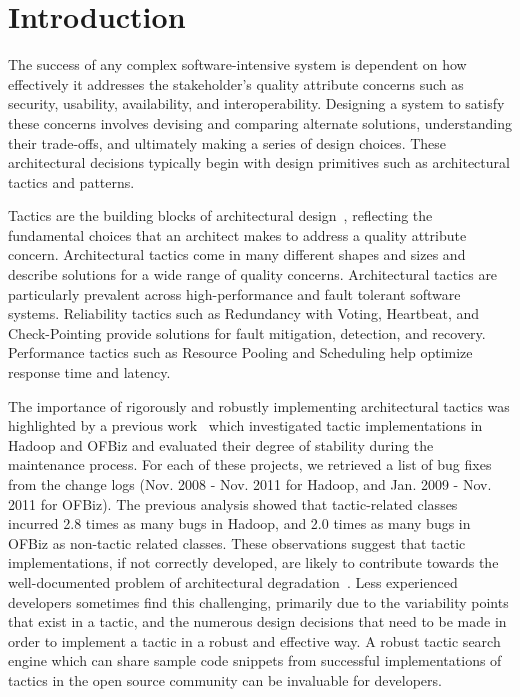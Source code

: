 \section{Introduction}
The success of any complex software-intensive system is dependent on how effectively it addresses the stakeholder's quality attribute concerns such as security, usability, availability, and interoperability. Designing a system to satisfy these concerns involves devising and comparing alternate solutions, understanding their trade-offs, and ultimately making a series of design choices. These architectural decisions typically begin with design primitives such as architectural tactics and patterns.

Tactics are the building blocks of architectural design~\cite{bass:arch12}, reflecting the fundamental choices that an architect makes to address a quality attribute concern. Architectural tactics come in many different shapes and sizes and describe solutions for a wide range of quality concerns. Architectural tactics are particularly prevalent across high-performance and fault tolerant software systems. Reliability tactics such as Redundancy with Voting, Heartbeat, and Check-Pointing provide solutions for fault mitigation, detection, and recovery. Performance tactics such as Resource Pooling and Scheduling help optimize response time and latency.







The importance of rigorously and robustly implementing architectural tactics was highlighted by a previous work~\cite{MSRBuble} which investigated tactic implementations in Hadoop and OFBiz and evaluated their degree of stability during the maintenance process. For each of these projects, we retrieved a list of bug fixes from the change logs (Nov. 2008 - Nov. 2011 for Hadoop, and Jan. 2009 - Nov. 2011 for OFBiz). The previous analysis showed that tactic-related classes incurred 2.8 times as many bugs in Hadoop, and 2.0 times as many bugs in OFBiz as non-tactic related classes. These observations suggest that tactic implementations, if not correctly developed, are likely to contribute towards the well-documented problem of architectural degradation~\cite{Erosion}. Less experienced developers sometimes find this challenging, primarily due to the variability points that exist in a tactic, and the numerous design decisions that need to be made in order to implement a tactic in a robust and effective way. A robust tactic search engine which can share sample code snippets from successful implementations of tactics in the open source community can be invaluable for developers.

